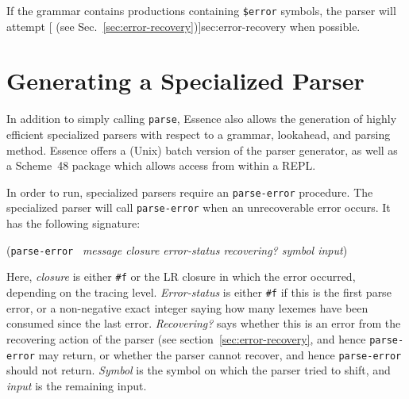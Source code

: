 \documentclass{article}
\renewcommand{\var}[1]{\noindent\mbox{\textit{#1}}}
\newcommand{\pproto}[2]{\unskip%
\mbox{\texonly{\spaceskip=0.5em}#1}%
\mbox{ }\texonly{\nobreak}\htmlonly{ }\textrm{#2}}
\newcommand{\proto}[3]{\par\bigskip\begin{flushleft}\pproto{(\texttt{#1}}{\textit{#2})}\hspace*{\fill}{#3}\end{flushleft}}
\newcommand{\codefont}[1]{\texttt{#1}}
\begin{document}
If the grammar contains productions containing \codefont{\$error}
symbols, the parser will attempt [ (see
Sec.~\ref{sec:error-recovery})]{sec:error-recovery} when possible.

\section{Generating a Specialized Parser}
\label{sec:parser-generation}

In addition to simply calling \codefont{parse}, Essence also allows
the generation of highly efficient specialized parsers with respect to
a grammar, lookahead, and parsing method.  Essence offers a (Unix)
batch version of the parser generator, as well as a Scheme~48 package
which allows access from within a REPL.

In order to run, specialized parsers require an \codefont{parse-error}
procedure.  The specialized parser will call \codefont{parse-error} when an
unrecoverable error occurs.  It has the following signature:

\proto{parse-error}{message closure error-status recovering? symbol input}{procedure}
%
Here, \var{closure} is either \verb|#f| or the LR closure in which the
error occurred, depending on the tracing level.  \var{Error-status} is
either \verb|#f| if this is the first parse error, or a non-negative
exact integer saying how many lexemes have been consumed since the
last error.  \var{Recovering?} says whether this is an error from the
recovering action of the parser (see section~\ref{sec:error-recovery},
and hence \codefont{parse-error} may return, or whether the parser
cannot recover, and hence \codefont{parse-error} should not return.
\var{Symbol} is the symbol on which the parser tried to shift, and
\var{input} is the remaining input.
\end{document}
